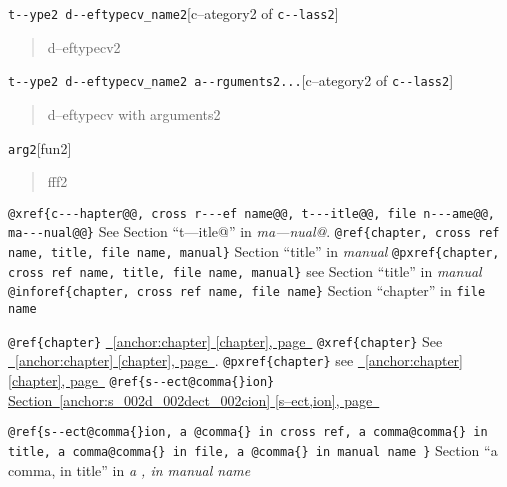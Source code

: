\documentclass{book}
\begin{document}
\begin{titlepage}
\noindent\texttt{t{-}{-}ype2 d{-}{-}eftypecv\_name2}\hfill[c--ategory2 of \texttt{c{-}{-}lass2}]



%
\begin{quote}
d--eftypecv2
\end{quote}

\noindent\texttt{t{-}{-}ype2 d{-}{-}eftypecv\_name2 a{-}{-}rguments2...}\hfill[c--ategory2 of \texttt{c{-}{-}lass2}]



%
\begin{quote}
d--eftypecv with arguments2
\end{quote}

\noindent\texttt{arg2}\hfill[fun2]



%
\begin{quote}
fff2
\end{quote}


\texttt{@xref\{c{-}{-}{-}hapter@@, cross r{-}{-}{-}ef name@@, t{-}{-}{-}itle@@, file n{-}{-}{-}ame@@, ma{-}{-}{-}nual@@\}} See Section ``t---itle@'' in \textsl{ma---nual@}.
\texttt{@ref\{chapter, cross ref name, title, file name, manual\}} Section ``title'' in \textsl{manual}
\texttt{@pxref\{chapter, cross ref name, title, file name, manual\}} see Section ``title'' in \textsl{manual}
\texttt{@inforef\{chapter, cross ref name, file name\}} Section ``chapter'' in \texttt{file name}

\texttt{@ref\{chapter\}} \hyperref[anchor:chapter]{\chaptername~\ref*{anchor:chapter} [chapter], page~\pageref*{anchor:chapter}}
\texttt{@xref\{chapter\}} See \hyperref[anchor:chapter]{\chaptername~\ref*{anchor:chapter} [chapter], page~\pageref*{anchor:chapter}}.
\texttt{@pxref\{chapter\}} see \hyperref[anchor:chapter]{\chaptername~\ref*{anchor:chapter} [chapter], page~\pageref*{anchor:chapter}}
\texttt{@ref\{s{-}{-}ect@comma\{\}ion\}} \hyperref[anchor:s_002d_002dect_002cion]{Section~\ref*{anchor:s_002d_002dect_002cion} [s--ect,ion], page~\pageref*{anchor:s_002d_002dect_002cion}}

\texttt{@ref\{s{-}{-}ect@comma\{\}ion, a @comma\{\} in cross
ref, a comma@comma\{\} in title, a comma@comma\{\} in file, a @comma\{\} in manual name \}}
Section ``a comma, in title'' in \textsl{a , in manual name}


\end{titlepage}
\end{document}
